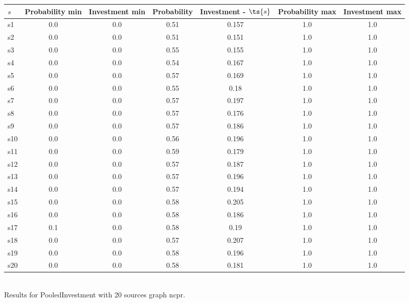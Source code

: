 \documentclass{article}
\begin{document}
\noindent\begin{tabular}{|l|c|c|c|c|c|c|}
\hline
$s$& Probability min & Investment min & Probability & Investment - $\ts{s}$ & Probability max & Investment max\\
\hline
s1 &0.0 & 0.0 & 0.51 & 0.157 & 1.0 & 1.0\\
\hline
s2 &0.0 & 0.0 & 0.51 & 0.151 & 1.0 & 1.0\\
\hline
s3 &0.0 & 0.0 & 0.55 & 0.155 & 1.0 & 1.0\\
\hline
s4 &0.0 & 0.0 & 0.54 & 0.167 & 1.0 & 1.0\\
\hline
s5 &0.0 & 0.0 & 0.57 & 0.169 & 1.0 & 1.0\\
\hline
s6 &0.0 & 0.0 & 0.55 & 0.18 & 1.0 & 1.0\\
\hline
s7 &0.0 & 0.0 & 0.57 & 0.197 & 1.0 & 1.0\\
\hline
s8 &0.0 & 0.0 & 0.57 & 0.176 & 1.0 & 1.0\\
\hline
s9 &0.0 & 0.0 & 0.57 & 0.186 & 1.0 & 1.0\\
\hline
s10 &0.0 & 0.0 & 0.56 & 0.196 & 1.0 & 1.0\\
\hline
s11 &0.0 & 0.0 & 0.59 & 0.179 & 1.0 & 1.0\\
\hline
s12 &0.0 & 0.0 & 0.57 & 0.187 & 1.0 & 1.0\\
\hline
s13 &0.0 & 0.0 & 0.57 & 0.196 & 1.0 & 1.0\\
\hline
s14 &0.0 & 0.0 & 0.57 & 0.194 & 1.0 & 1.0\\
\hline
s15 &0.0 & 0.0 & 0.58 & 0.205 & 1.0 & 1.0\\
\hline
s16 &0.0 & 0.0 & 0.58 & 0.186 & 1.0 & 1.0\\
\hline
s17 &0.1 & 0.0 & 0.58 & 0.19 & 1.0 & 1.0\\
\hline
s18 &0.0 & 0.0 & 0.57 & 0.207 & 1.0 & 1.0\\
\hline
s19 &0.0 & 0.0 & 0.58 & 0.196 & 1.0 & 1.0\\
\hline
s20 &0.0 & 0.0 & 0.58 & 0.181 & 1.0 & 1.0\\
\hline
\end{tabular}\\

\noindent Results for PooledInvestment with 20 sources graph ncpr.
\end{document}
